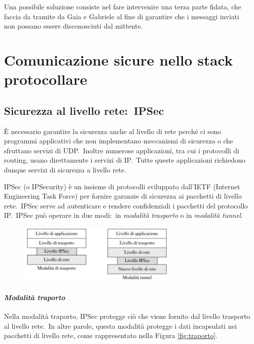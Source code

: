 Una possibile soluzione consiste nel fare intervenire una terza parte fidata, che faccia da tramite da Gaia e Gabriele al fine di garantire che i messaggi inviati non possano essere disconosciuti dal mittente.

\section{Comunicazione sicure nello stack protocollare}

\subsection{Sicurezza al livello rete:\ IPSec}

È necessario garantire la sicurezza anche al livello di rete perché ci sono programmi applicativi che non implementano meccanismi di sicurezza o che sfruttano servizi di UDP.\
Inoltre numerose applicazioni, tra cui i protocolli di routing, usano direttamente i servizi di IP.\
Tutte queste applicazioni richiedono dunque servizi di sicurezza a livello rete.

IPSec (o IPSecurity) è un insieme di protocolli sviluppato dall'IETF (Internet Engineering Task Force) per fornire garanzie di sicurezza ai pacchetti di livello rete.\
IPSec serve ad autenticare e rendere confidenziali i pacchetti del protocollo IP.\
IPSec può operare in due modi:\ in \textit{modalità trasporto} o in \textit{modalità tunnel}.
\begin{figure}[H]
    \centering
    \includegraphics[width=0.7\textwidth]{immagini/IPSec.png}
\end{figure}

\paragraph{\textit{Modalità traporto}}

Nella modalità traporto, IPSec protegge ciò che viene fornito dal livello trasporto al livello rete.\
In altre parole, questa modalità protegge i dati incapsulati nei pacchetti di livello rete, come rappresentato nella Figura \ref{fig:traporto}.

